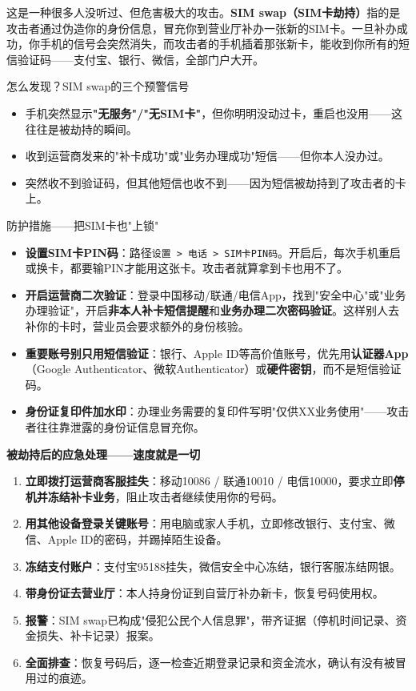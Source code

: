这是一种很多人没听过、但危害极大的攻击。\textbf{SIM swap（SIM卡劫持）}指的是攻击者通过伪造你的身份信息，冒充你到营业厅补办一张新的SIM卡。一旦补办成功，你手机的信号会突然消失，而攻击者的手机插着那张新卡，能收到你所有的短信验证码——支付宝、银行、微信，全部门户大开。

\begin{tcbinfo}{怎么发现？SIM swap的三个预警信号}
\begin{itemize}
  \item 手机突然显示\textbf{"无服务"/"无SIM卡"}，但你明明没动过卡，重启也没用——这往往是被劫持的瞬间。
  \item 收到运营商发来的"补卡成功"或"业务办理成功"短信——但你本人没办过。
  \item 突然收不到验证码，但其他短信也收不到——因为短信被劫持到了攻击者的卡上。
\end{itemize}

\end{tcbinfo}

\begin{tcbwarn}{防护措施——把SIM卡也"上锁"}
\begin{itemize}
  \item \textbf{设置SIM卡PIN码}：路径\texttt{设置 > 电话 > SIM卡PIN码}。开启后，每次手机重启或换卡，都要输PIN才能用这张卡。攻击者就算拿到卡也用不了。
  \item \textbf{开启运营商二次验证}：登录中国移动/联通/电信App，找到"安全中心"或"业务办理验证"，开启\textbf{非本人补卡短信提醒}和\textbf{业务办理二次密码验证}。这样别人去补你的卡时，营业员会要求额外的身份核验。
  \item \textbf{重要账号别只用短信验证}：银行、Apple ID等高价值账号，优先用\textbf{认证器App}（Google Authenticator、微软Authenticator）或\textbf{硬件密钥}，而不是短信验证码。
  \item \textbf{身份证复印件加水印}：办理业务需要的复印件写明"仅供XX业务使用"——攻击者往往靠泄露的身份证信息冒充你。
\end{itemize}

\end{tcbwarn}

\textbf{被劫持后的应急处理——速度就是一切}\par

\begin{enumerate}
  \item \textbf{立即拨打运营商客服挂失}：移动10086 / 联通10010 / 电信10000，要求立即\textbf{停机并冻结补卡业务}，阻止攻击者继续使用你的号码。
  \item \textbf{用其他设备登录关键账号}：用电脑或家人手机，立即修改银行、支付宝、微信、Apple ID的密码，并踢掉陌生设备。
  \item \textbf{冻结支付账户}：支付宝95188挂失，微信安全中心冻结，银行客服冻结网银。
  \item \textbf{带身份证去营业厅}：本人持身份证到自营厅补办新卡，恢复号码使用权。
  \item \textbf{报警}：SIM swap已构成"侵犯公民个人信息罪"，带齐证据（停机时间记录、资金损失、补卡记录）报案。
  \item \textbf{全面排查}：恢复号码后，逐一检查近期登录记录和资金流水，确认有没有被冒用过的痕迹。
\end{enumerate}

